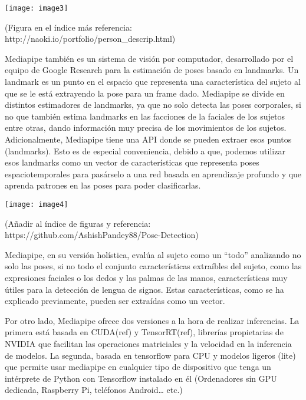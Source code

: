 \documentclass{article} %
\begin{document}
\noindent 

\noindent \texttt{[image: image3]}

  

 (Figura en el \'{i}ndice m\'{a}s referencia: http://naoki.io/portfolio/person\_descrip.html)

\noindent Mediapipe tambi\'{e}n es un sistema de visi\'{o}n por computador, desarrollado por el equipo de Google Research para la estimaci\'{o}n de poses basado en landmarks. Un landmark es un punto en el espacio que representa una caracter\'{i}stica del sujeto al que se le est\'{a} extrayendo la pose para un frame dado. Mediapipe se divide en distintos estimadores de landmarks, ya que no solo detecta las poses corporales, si no que tambi\'{e}n estima landmarks en las facciones de la faciales de los sujetos entre otras, dando informaci\'{o}n muy precisa de los movimientos de los sujetos. Adicionalmente, Mediapipe tiene una API donde se pueden extraer esos puntos (landmarks). Esto es de especial conveniencia, debido a que, podemos utilizar esos landmarks como un vector de caracter\'{i}sticas que representa poses espaciotemporales para pas\'{a}rselo a una red basada en aprendizaje profundo y que aprenda patrones en las poses para poder clasificarlas.

\noindent 

\noindent \texttt{[image: image4]}

\noindent 

\noindent (A\~{n}adir al \'{i}ndice de figuras y referencia: https://github.com/AshishPandey88/Pose-Detection)

\noindent 

\noindent Mediapipe, en su versi\'{o}n hol\'{i}stica, eval\'{u}a al sujeto como un ``todo'' analizando no solo las poses, si no todo el conjunto caracter\'{i}sticas extra\'{i}bles del sujeto, como las expresiones faciales o los dedos y las palmas de las manos, caracter\'{i}sticas muy \'{u}tiles para la detecci\'{o}n de lengua de signos. Estas caracter\'{i}sticas, como se ha explicado previamente, pueden ser extra\'{i}das como un vector.

\noindent 

\noindent Por otro lado, Mediapipe ofrece dos versiones a la hora de realizar inferencias. La primera est\'{a} basada en CUDA(ref) y TensorRT(ref), librer\'{i}as propietarias de NVIDIA que facilitan las operaciones matriciales y la velocidad en la inferencia de modelos. La segunda, basada en tensorflow para CPU y modelos ligeros (lite) que permite usar mediapipe en cualquier tipo de dispositivo que tenga un int\'{e}rprete de Python con Tensorflow instalado en \'{e}l (Ordenadores sin GPU dedicada, Raspberry Pi, tel\'{e}fonos Android{\dots} etc.)
\end{document}
